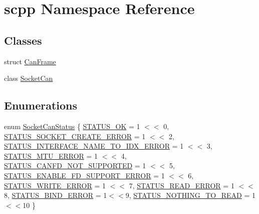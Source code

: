 \hypertarget{namespacescpp}{}\section{scpp Namespace Reference}
\label{namespacescpp}
\subsection*{Classes}
\begin{DoxyCompactItemize}
\item 
struct \hyperlink{structscpp_1_1CanFrame}{Can\+Frame}
\item 
class \hyperlink{classscpp_1_1SocketCan}{Socket\+Can}
\end{DoxyCompactItemize}
\subsection*{Enumerations}
\begin{DoxyCompactItemize}
\item 
enum \hyperlink{namespacescpp_abc60b9ed5f90c311397500d39ff15ef2}{Socket\+Can\+Status} \{ \newline
\hyperlink{namespacescpp_abc60b9ed5f90c311397500d39ff15ef2a53b5fdc5faaffef39e0e68f5a21d325e}{S\+T\+A\+T\+U\+S\+\_\+\+OK} = 1 $<$$<$ 0, 
\hyperlink{namespacescpp_abc60b9ed5f90c311397500d39ff15ef2aded24dcc95cb7802e507c43626f9b421}{S\+T\+A\+T\+U\+S\+\_\+\+S\+O\+C\+K\+E\+T\+\_\+\+C\+R\+E\+A\+T\+E\+\_\+\+E\+R\+R\+OR} = 1 $<$$<$ 2, 
\hyperlink{namespacescpp_abc60b9ed5f90c311397500d39ff15ef2a252ae5e35f3ed5052bedce23d61608e6}{S\+T\+A\+T\+U\+S\+\_\+\+I\+N\+T\+E\+R\+F\+A\+C\+E\+\_\+\+N\+A\+M\+E\+\_\+\+T\+O\+\_\+\+I\+D\+X\+\_\+\+E\+R\+R\+OR} = 1 $<$$<$ 3, 
\hyperlink{namespacescpp_abc60b9ed5f90c311397500d39ff15ef2ac225743b21fce584ff408ae539f787dc}{S\+T\+A\+T\+U\+S\+\_\+\+M\+T\+U\+\_\+\+E\+R\+R\+OR} = 1 $<$$<$ 4, 
\newline
\hyperlink{namespacescpp_abc60b9ed5f90c311397500d39ff15ef2ae8db68c020fb95b48e69d9692851fe8b}{S\+T\+A\+T\+U\+S\+\_\+\+C\+A\+N\+F\+D\+\_\+\+N\+O\+T\+\_\+\+S\+U\+P\+P\+O\+R\+T\+ED} = 1 $<$$<$ 5, 
\hyperlink{namespacescpp_abc60b9ed5f90c311397500d39ff15ef2ad201ecb521d02b418c77f468fd01d0d4}{S\+T\+A\+T\+U\+S\+\_\+\+E\+N\+A\+B\+L\+E\+\_\+\+F\+D\+\_\+\+S\+U\+P\+P\+O\+R\+T\+\_\+\+E\+R\+R\+OR} = 1 $<$$<$ 6, 
\hyperlink{namespacescpp_abc60b9ed5f90c311397500d39ff15ef2a918ddd3e17c5ee4817cc69c1573a085e}{S\+T\+A\+T\+U\+S\+\_\+\+W\+R\+I\+T\+E\+\_\+\+E\+R\+R\+OR} = 1 $<$$<$ 7, 
\hyperlink{namespacescpp_abc60b9ed5f90c311397500d39ff15ef2aeff45184006bb41061453d3c006d2790}{S\+T\+A\+T\+U\+S\+\_\+\+R\+E\+A\+D\+\_\+\+E\+R\+R\+OR} = 1 $<$$<$ 8, 
\newline
\hyperlink{namespacescpp_abc60b9ed5f90c311397500d39ff15ef2a88c97d9764f286b7ad6ae18813d5268b}{S\+T\+A\+T\+U\+S\+\_\+\+B\+I\+N\+D\+\_\+\+E\+R\+R\+OR} = 1$<$$<$9, 
\hyperlink{namespacescpp_abc60b9ed5f90c311397500d39ff15ef2a87cc201637559e32e65cd179ca92e63a}{S\+T\+A\+T\+U\+S\+\_\+\+N\+O\+T\+H\+I\+N\+G\+\_\+\+T\+O\+\_\+\+R\+E\+AD} = 1$<$$<$10
 \}
\end{DoxyCompactItemize}
